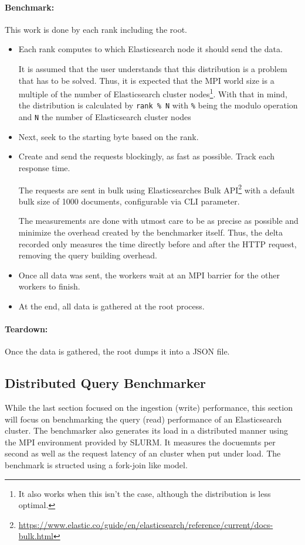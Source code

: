 \paragraph{Benchmark:} This work is done by each rank including the root.
\begin{itemize}
  \item Each rank computes to which Elasticsearch node it should send the data. 

    It is assumed that the user understands that this distribution is a problem that has to be solved. Thus, it is expected that the \ac{MPI} world size is a multiple of the number of Elasticsearch cluster nodes\footnote{It also works when this isn't the case, although the distribution is less optimal.}. With that in mind, the distribution is calculated by \texttt{rank \% N} with \texttt{\%} being the modulo operation and \texttt{N} the number of Elasticsearch cluster nodes

  \item Next, seek to the starting byte based on the rank.
  \item Create and send the requests blockingly, as fast as possible. Track each response time.

    The requests are sent in bulk using Elasticsearches Bulk API\footnote{\url{https://www.elastic.co/guide/en/elasticsearch/reference/current/docs-bulk.html}} with a default bulk size of 1000 documents, configurable via CLI parameter.

    The measurements are done with utmost care to be as precise as possible and minimize the overhead created by the benchmarker itself. Thus, the delta recorded only measures the time directly before and after the HTTP request, removing the query building overhead.
  \item Once all data was sent, the workers wait at an \ac{MPI} barrier for the other workers to finish.
  \item At the end, all data is gathered at the root process.
\end{itemize}

\paragraph{Teardown:}
Once the data is gathered, the root dumps it into a \ac{JSON} file.

\subsection{Distributed Query Benchmarker}
While the last section focused on the ingestion (write) performance, this section will focus on benchmarking the query (read) performance of an Elasticsearch cluster. The benchmarker also generates its load in a distributed manner using the \ac{MPI} environment provided by SLURM. It measures the docuemnts per second as well as the request latency of an cluster when put under load. The benchmark is structed using a fork-join like model. 

